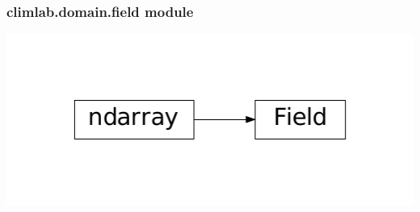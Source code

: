 \documentclass[a4paper,10pt,english]{sphinxmanual}
\begin{document}
\subsubsection{climlab.domain.field module}
\label{api/climlab.domain:climlab-domain-field-module}
\includegraphics{inheritance-bd94d8d8d1fffd6b46be30171e123025249e6f21.pdf}
\label{api/climlab.domain:module-climlab.domain.field}
\end{document}
